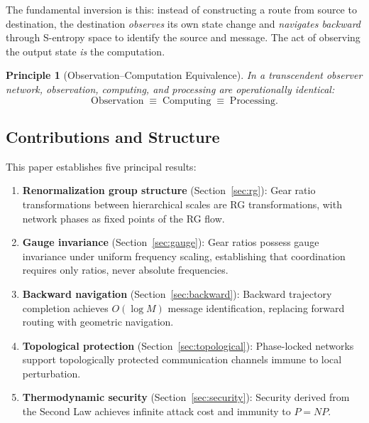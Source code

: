 \documentclass[11pt,twocolumn,a4paper]{article}
\newtheorem{principle}[theorem]{Principle}
\theoremstyle{definition}
\begin{document}
The fundamental inversion is this: instead of constructing a route from source to
destination, the destination \emph{observes} its own state change and \emph{navigates
backward} through S-entropy space to identify the source and message. The act of
observing the output state \emph{is} the computation.

\begin{principle}[Observation--Computation Equivalence]\label{princ:obs-comp}
In a transcendent observer network, observation, computing, and processing are
operationally identical:
\[
  \text{Observation} \;\equiv\; \text{Computing} \;\equiv\; \text{Processing}.
\]
\end{principle}

\subsection{Contributions and Structure}\label{sec:intro:contributions}

This paper establishes five principal results:

\begin{enumerate}
  \item \textbf{Renormalization group structure} (Section~\ref{sec:rg}): Gear ratio
        transformations between hierarchical scales are RG transformations, with network
        phases as fixed points of the RG flow.
  \item \textbf{Gauge invariance} (Section~\ref{sec:gauge}): Gear ratios possess gauge
        invariance under uniform frequency scaling, establishing that coordination
        requires only ratios, never absolute frequencies.
  \item \textbf{Backward navigation} (Section~\ref{sec:backward}): Backward trajectory
        completion achieves $O(\log M)$ message identification, replacing forward routing
        with geometric navigation.
  \item \textbf{Topological protection} (Section~\ref{sec:topological}): Phase-locked
        networks support topologically protected communication channels immune to local
        perturbation.
  \item \textbf{Thermodynamic security} (Section~\ref{sec:security}): Security derived
        from the Second Law achieves infinite attack cost and immunity to $P = NP$.
\end{enumerate}
\end{document}
